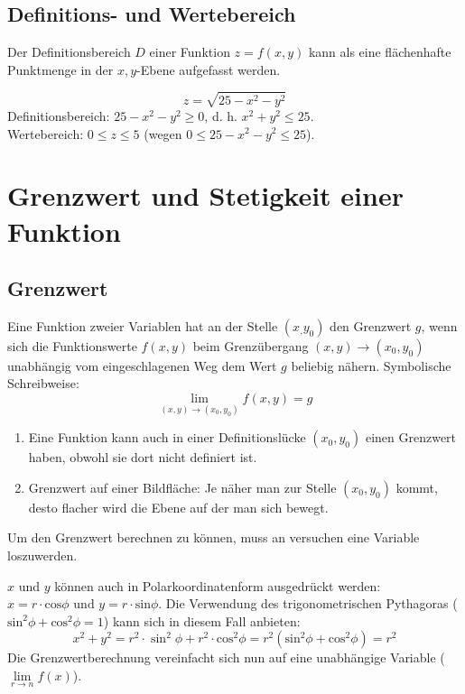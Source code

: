 \subsection{Definitions- und Wertebereich}
Der Definitionsbereich $D$ einer Funktion $z = f(x,y)$ kann als eine flächenhafte Punktmenge in der $x, y$-Ebene aufgefasst werden.
\begin{bsp}
$$z = \sqrt{25-x^2-y^2}$$
Definitionsbereich: $ 25-x^2-y^2 \geq 0$, d. h. $x^2 + y^2 \leq 25$.\\
Wertebereich: $ 0 \leq z \leq 5$ (wegen $0\leq 25 -x^2-y^2 \leq 25$).
\end{bsp}

\section{Grenzwert und Stetigkeit einer Funktion}
\subsection{Grenzwert}
\begin{definition}
Eine Funktion zweier Variablen hat an der Stelle $(x_,y_0)$ den Grenzwert $g$, wenn sich die Funktionswerte $f(x,y)$ beim Grenzübergang $(x,y) \rightarrow (x_0,y_0)$ unabhängig vom eingeschlagenen Weg dem Wert $g$ beliebig nähern. Symbolische Schreibweise:
$$\lim\limits_{(x,y) \rightarrow (x_0,y_0)} f(x,y) = g$$
\begin{enumerate}
\item Eine Funktion kann auch in einer Definitionslücke $(x_0,y_0)$ einen Grenzwert haben, obwohl sie dort nicht definiert ist.
\item Grenzwert auf einer Bildfläche: Je näher man zur Stelle $(x_0,y_0)$ kommt, desto flacher wird die Ebene auf der man sich bewegt.
\end{enumerate}
\end{definition}

Um den Grenzwert berechnen zu können, muss an versuchen eine Variable loszuwerden.
\begin{bsp}
$x$ und $y$ können auch in Polarkoordinatenform ausgedrückt werden: $x = r \cdot \text{cos} \phi \text{ und } y = r \cdot \text{sin} \phi$. Die Verwendung des trigonometrischen Pythagoras ($\text{sin}^2 \phi + \text{cos}^2 \phi = 1$) kann sich in diesem Fall anbieten:
$$ x^2 + y^2 =  r^2 \cdot \sin^2 \phi + r^2 \cdot \text{cos}^2 \phi =r^2(\text{sin}^2 \phi + \text{cos}^2 \phi) = r^2$$
Die Grenzwertberechnung vereinfacht sich nun auf eine unabhängige Variable ($\lim\limits_{r\rightarrow n} f(x)$).
\end{bsp}

